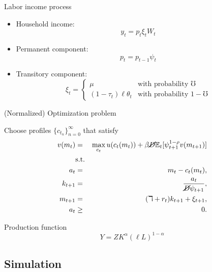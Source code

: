 \documentclass{beamer}
\begin{document}
\small
\begin{frame}{Labor income process}

\begin{itemize}
\item Household income: $$y_t = p_t \xi_t W_t$$
\item Permanent component: $$p_t = p_{t-1} \psi_t$$
\item Transitory component: $$\xi_t =
    \begin{cases}
       \mu & \text{with probability $\mho$} \\
      (1-\tau_t) \ell \theta_t & \text{with probability $1-\mho$}
   \end{cases}$$
\end{itemize}

\end{frame}

\footnotesize
\begin{frame}{(Normalized) Optimization problem}

Choose profiles $\{c_{t_n}\}_{n=0}^{\infty}$ that satisfy
 \begin{eqnarray*}
  v(m_t) &=& \max_{c_t} u(c_t(m_t)) + \beta \cancel{D} \mathbb{E}_{t}[\psi_{t+1}^{1-\rho}v(m_{t+1})] \\
  &\text{s.t.}& \\
  a_t &=& m_t - c_t(m_t), \\
  k_{t+1} &=& \frac{a_t}{\cancel{D}\psi_{t+1}}, \\
  m_{t+1} &=& (\daleth + r_t)k_{t+1} + \xi_{t+1}, \\
  a_t &\geq& 0.
\end{eqnarray*}

Production function $$Y = Z K^{\alpha} (\ell L)^{1-\alpha}$$

\end{frame}

\subsection{Simulation}
\end{document}
